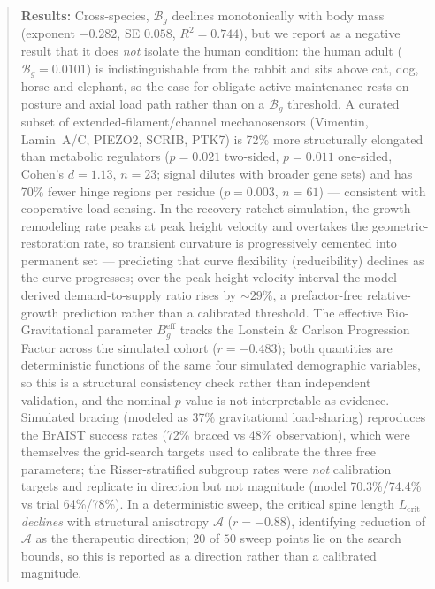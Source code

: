 \begin{abstract}
\noindent\textbf{Results:} Cross-species, $\mathcal{B}_g$ declines monotonically with body mass (exponent $-0.282$, SE $0.058$, $R^2=0.744$), but we report as a negative result that it does \emph{not} isolate the human condition: the human adult ($\mathcal{B}_g = 0.0101$) is indistinguishable from the rabbit and sits above cat, dog, horse and elephant, so the case for obligate active maintenance rests on posture and axial load path rather than on a $\mathcal{B}_g$ threshold. A curated subset of extended-filament/channel mechanosensors (Vimentin, Lamin~A/C, PIEZO2, SCRIB, PTK7) is 72\% more structurally elongated than metabolic regulators ($p=0.021$ two-sided, $p=0.011$ one-sided, Cohen's $d=1.13$, $n=23$; signal dilutes with broader gene sets) and has 70\% fewer hinge regions per residue ($p=0.003$, $n=61$) --- consistent with cooperative load-sensing. In the recovery-ratchet simulation, the growth-remodeling rate peaks at peak height velocity and overtakes the geometric-restoration rate, so transient curvature is progressively cemented into permanent set --- predicting that curve flexibility (reducibility) declines as the curve progresses; over the peak-height-velocity interval the model-derived demand-to-supply ratio rises by ${\sim}29\%$, a prefactor-free relative-growth prediction rather than a calibrated threshold. The effective Bio-Gravitational parameter $B_g^{\mathrm{eff}}$ tracks the Lonstein \& Carlson Progression Factor across the simulated cohort ($r = -0.483$); both quantities are deterministic functions of the same four simulated demographic variables, so this is a structural consistency check rather than independent validation, and the nominal $p$-value is not interpretable as evidence. Simulated bracing (modeled as 37\% gravitational load-sharing) reproduces the BrAIST success rates (72\% braced vs 48\% observation), which were themselves the grid-search targets used to calibrate the three free parameters; the Risser-stratified subgroup rates were \emph{not} calibration targets and replicate in direction but not magnitude (model 70.3\%/74.4\% vs trial 64\%/78\%). In a deterministic sweep, the critical spine length $L_{\mathrm{crit}}$ \emph{declines} with structural anisotropy $\mathcal{A}$ ($r=-0.88$), identifying reduction of $\mathcal{A}$ as the therapeutic direction; $20$ of $50$ sweep points lie on the search bounds, so this is reported as a direction rather than a calibrated magnitude.


\end{abstract}
